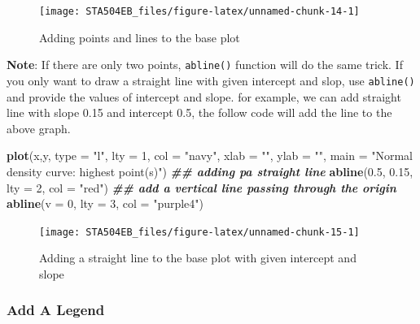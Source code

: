 \documentclass[
]{book}
\newenvironment{Shaded}{\begin{snugshade}}{\end{snugshade}}
\newcommand{\AttributeTok}[1]{\textcolor[rgb]{0.13,0.29,0.53}{#1}}
\newcommand{\DecValTok}[1]{\textcolor[rgb]{0.00,0.00,0.81}{#1}}
\newcommand{\DocumentationTok}[1]{\textcolor[rgb]{0.56,0.35,0.01}{\textbf{\textit{#1}}}}
\newcommand{\FloatTok}[1]{\textcolor[rgb]{0.00,0.00,0.81}{#1}}
\newcommand{\FunctionTok}[1]{\textcolor[rgb]{0.13,0.29,0.53}{\textbf{#1}}}
\newcommand{\NormalTok}[1]{#1}
\newcommand{\StringTok}[1]{\textcolor[rgb]{0.31,0.60,0.02}{#1}}
\begin{document}
\begin{figure}

{\centering \texttt{[image: STA504EB\_files/figure-latex/unnamed-chunk-14-1]} 

}

\caption{Adding points and lines to the base plot}\label{fig:unnamed-chunk-14}
\end{figure}

\textbf{Note}: If there are only two points, \texttt{abline()} function will do the same trick. If you only want to draw a straight line with given intercept and slop, use \texttt{abline()} and provide the values of intercept and slope. for example, we can add straight line with slope 0.15 and intercept 0.5, the follow code will add the line to the above graph.

\begin{Shaded}
\begin{Highlighting}[]
\FunctionTok{plot}\NormalTok{(x,y, }\AttributeTok{type =} \StringTok{"l"}\NormalTok{, }\AttributeTok{lty =} \DecValTok{1}\NormalTok{, }\AttributeTok{col =} \StringTok{"navy"}\NormalTok{, }\AttributeTok{xlab =} \StringTok{""}\NormalTok{, }\AttributeTok{ylab =} \StringTok{""}\NormalTok{,}
     \AttributeTok{main =} \StringTok{"Normal density curve: highest point(s)"}\NormalTok{)}
\DocumentationTok{\#\# adding pa straight line}
\FunctionTok{abline}\NormalTok{(}\FloatTok{0.5}\NormalTok{, }\FloatTok{0.15}\NormalTok{, }\AttributeTok{lty =} \DecValTok{2}\NormalTok{, }\AttributeTok{col =} \StringTok{"red"}\NormalTok{)}
\DocumentationTok{\#\# add a vertical line passing through the origin}
\FunctionTok{abline}\NormalTok{(}\AttributeTok{v =} \DecValTok{0}\NormalTok{, }\AttributeTok{lty =} \DecValTok{3}\NormalTok{, }\AttributeTok{col =} \StringTok{"purple4"}\NormalTok{)}
\end{Highlighting}
\end{Shaded}

\begin{figure}

{\centering \texttt{[image: STA504EB\_files/figure-latex/unnamed-chunk-15-1]} 

}

\caption{Adding a straight line to the base plot with given intercept and slope}\label{fig:unnamed-chunk-15}
\end{figure}

\hypertarget{add-a-legend}{%
\subsubsection{Add A Legend}\label{add-a-legend}}
\end{document}
